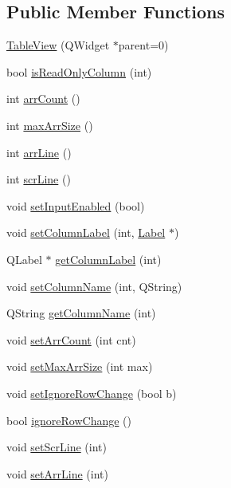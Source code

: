 \subsection*{Public Member Functions}
\begin{DoxyCompactItemize}
\item 
\hyperlink{classTableView_adb6530c7759567b474c3a3b7ba81855c}{TableView} (QWidget $\ast$parent=0)
\item 
bool \hyperlink{classTableView_a845c45c80748f79f3e81f7bf77e5261a}{isReadOnlyColumn} (int)
\item 
int \hyperlink{classTableView_a35187a10df2c76c9fe9099d17d9869cd}{arrCount} ()
\item 
int \hyperlink{classTableView_a2573035b04bb9582878096d501381e3b}{maxArrSize} ()
\item 
int \hyperlink{classTableView_a7ec1fcd1ab0302dde810332c72602273}{arrLine} ()
\item 
int \hyperlink{classTableView_aecb8d3ea59d572fb9a7df9a7ba798c20}{scrLine} ()
\item 
void \hyperlink{classTableView_ac80392b3e39df8bb876d5ac378375caf}{setInputEnabled} (bool)
\item 
void \hyperlink{classTableView_a5a86ed0c209382e0c31266952d3fafaf}{setColumnLabel} (int, \hyperlink{classLabel}{Label} $\ast$)
\item 
QLabel $\ast$ \hyperlink{classTableView_a22d025267d25ecfe7684c31edab75a2a}{getColumnLabel} (int)
\item 
void \hyperlink{classTableView_ac8f1f15e7ec4e97a15560d1c00ce7b02}{setColumnName} (int, QString)
\item 
QString \hyperlink{classTableView_af953c1328e203f9b0d380b9d5c6125ff}{getColumnName} (int)
\item 
void \hyperlink{classTableView_a2bd7391fdc86cdd2f57f40b220aacf9d}{setArrCount} (int cnt)
\item 
void \hyperlink{classTableView_a53b722124712ba16befce5b620a82a8f}{setMaxArrSize} (int max)
\item 
void \hyperlink{classTableView_a41a45f3b1b6fc2be38f7068629bd9462}{setIgnoreRowChange} (bool b)
\item 
bool \hyperlink{classTableView_a83872a716abf63ed862c2c4607dc4146}{ignoreRowChange} ()
\item 
void \hyperlink{classTableView_ac961015fe4c7fe1c5af03035db501400}{setScrLine} (int)
\item 
void \hyperlink{classTableView_a9579368ee0b02a654fc5f68ff504a83f}{setArrLine} (int)
\item 

\end{DoxyCompactItemize}
